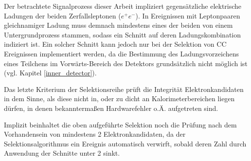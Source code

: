 \begin{description}
\pagebreak

        Der betrachtete Signalprozess dieser Arbeit impliziert gegensätzliche
        elektrische Ladungen der beiden Zerfallsleptonen ($e^+e^-$). In
        Ereignissen mit Leptonpaaren gleichnamiger Ladung muss demnach
        mindestens eines der beiden von einem Untergrundprozess stammen, sodass
        ein Schnitt auf deren Ladungskombination indiziert ist. Ein solcher
        Schnitt kann jedoch nur bei der Selektion von \ac{CC} Ereignissen
        implementiert werden, da die Bestimmung des Ladungsvorzeichens eines
        Teilchens im Vorwärts-Bereich des Detektors grundsätzlich  nicht
        möglich ist (vgl. Kapitel \ref{inner_detector}).

        Das letzte Kriterium der Selektionsreihe prüft die Integrität
        Elektronkandidaten in dem Sinne, als diese nicht in, oder zu dicht an
        Kalorimeterbereichen liegen dürfen, in denen bekanntermaßen
        Hardwarefehler o.Ä. aufgetreten sind.
\end{description}
Implizit beinhaltet die oben aufgeführte Selektion noch die Prüfung nach dem
Vorhandensein von mindestens 2 Elektronkandidaten, da der Selektionsalgorithmus
ein Ereignis automatisch verwirft, sobald deren Zahl durch Anwendung der
Schnitte unter 2 sinkt.

